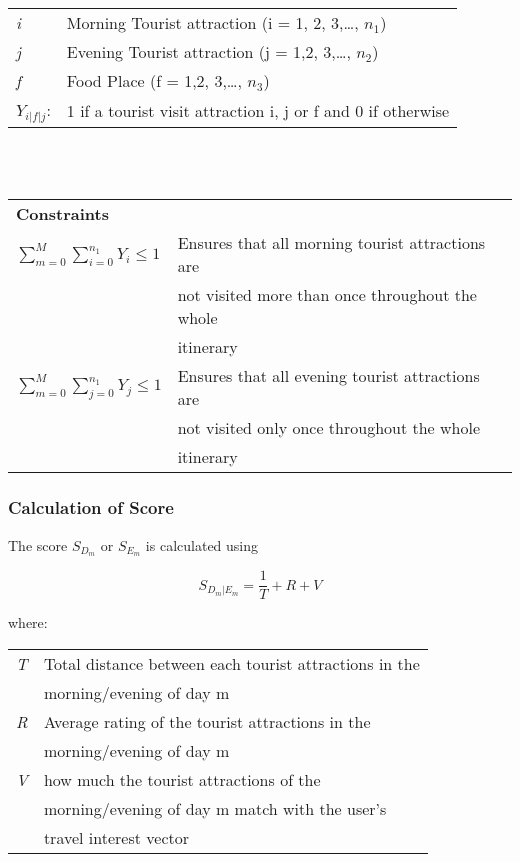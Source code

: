 \begin{tabular}{l l}

\textit{i} & Morning Tourist attraction (i = 1, 2, 3,…, $n_1$)\\
\textit{j} & Evening Tourist attraction (j = 1,2, 3,…, $n_2$)\\
\textit{f} & Food Place (f = 1,2, 3,…, $n_3$)\\
\textit{$Y_{i|f|j}$}: & 1 if a tourist visit attraction i, j or f and  0 if otherwise\\
\end{tabular}
\\ 
\\
\begin{tabular}{l l}
\textbf{Constraints} & \\
\textit{$ \sum_{m=0}^{M}\sum_{i=0}^{n_1}{Y_i} \leq 1$} & Ensures that all morning tourist attractions are \\ & not visited more than once throughout the whole \\ & itinerary\\

\textit{$ \sum_{m=0}^{M}\sum_{j=0}^{n_1}{Y_j} \leq 1$} & Ensures that all evening tourist attractions are \\ & not visited only once throughout the whole \\ & itinerary\\


\end{tabular}

\subsubsection{Calculation of Score}

The score $S_{D_m}$ or $S_{E_m}$ is calculated using

\[ S_{D_m | E_m} = \frac{1}{T} + R + V\]

where:
\\
\begin{tabular}{l l}
\textit{T} & Total distance between each tourist attractions in the \\ & morning/evening of day m\\ 
\textit{R} & Average rating of the tourist attractions in the \\ & morning/evening of day m \\  
\textit{V} & how much the tourist attractions of the \\ & morning/evening of day m match with the user's \\ & travel interest vector \\  

\end{tabular}
\\
\\


